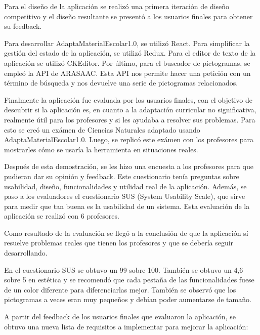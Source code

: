 Para el diseño de la aplicación se realizó una primera iteración de diseño competitivo y el diseño resultante se presentó a los usuarios finales para obtener su feedback.

Para desarrollar AdaptaMaterialEscolar1.0, se utilizó React. Para simplificar la gestión del estado de la aplicación, se utilizó Redux. Para el editor de texto de la aplicación se utilizó CKEditor. Por último, para el buscador de pictogramas, se empleó la API de ARASAAC. Esta API nos permite hacer una petición con un término de búsqueda y nos devuelve una serie de pictogramas relacionados.

Finalmente la aplicación fue evaluada por los usuarios finales, con el objetivo de descubrir si la aplicación es, en cuanto a la adaptación curricular no significativa, realmente útil para los profesores y si les ayudaba a resolver sus problemas. Para esto se creó un exámen de Ciencias Naturales adaptado usando AdaptaMaterialEscolar1.0. Luego, se replicó este exámen con los profesores para mostrarles cómo se usaría la herramienta en situaciones reales.

Después de esta demostración, se les hizo una encuesta a los profesores para que pudieran dar su opinión y feedback. Este cuestionario tenía preguntas sobre usabilidad, diseño, funcionalidades y utilidad real de la aplicación. Además, se paso a los evaluadores el cuestionario SUS (System Usability Scale), que sirve para medir que tan buena es la usabilidad de un sistema. Esta evaluación de la aplicación se realizó con 6 profesores.

Como resultado de la evaluación se llegó a la conclusión de que la aplicación sí resuelve problemas reales que tienen los profesores y que se debería seguir desarrollando.

En el cuestionario SUS se obtuvo un 99 sobre 100. También se obtuvo un 4,6 sobre 5 en estética y se recomendó que cada pestaña de las funcionalidades fuese de un color diferente para diferenciarlas mejor. También se observó que los pictogramas a veces eran muy pequeños y debían poder aumentarse de tamaño.

A partir del feedback de los usuarios finales que evaluaron la aplicación, se obtuvo una nueva lista de requisitos a implementar para mejorar la aplicación:


